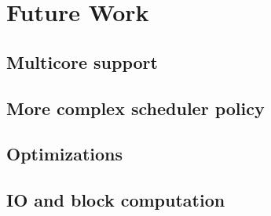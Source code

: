 
\chapter{Future Work}

\section{Multicore support}
\section{More complex scheduler policy}
\section{Optimizations}
\section{IO and block computation}

